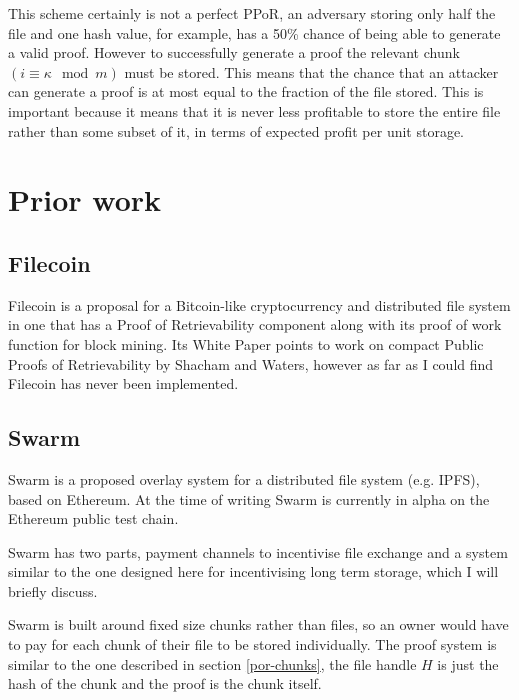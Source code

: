 \documentclass[12pt,a4paper,twoside,openright]{report}
\begin{document}

This scheme certainly is not a perfect PPoR, an adversary storing only half the file and one hash value, for example, has a 50\% chance of being able to generate a valid proof.
However to successfully generate a proof the relevant chunk $(i \equiv \kappa \mod m)$ must be stored.
This means that the chance that an attacker can generate a proof is at most equal to the fraction of the file stored.
This is important because it means that it is never less profitable to store the entire file rather than some subset of it, in terms of expected profit per unit storage.






\section{Prior work}


\subsection{Filecoin}

Filecoin is a proposal for a Bitcoin-like cryptocurrency and distributed file system in one
that has a Proof of Retrievability component along with its proof of work function for block mining.
Its White Paper\cite{filecoin} points to work on compact Public Proofs of Retrievability by Shacham and Waters\cite{compact-por},
however as far as I could find Filecoin has never been implemented.

\subsection{Swarm}


Swarm is a proposed overlay system for a distributed file system (e.g. IPFS\cite{ipfs}), based on Ethereum.
At the time of writing Swarm is currently in alpha on the Ethereum public test chain\cite{swarm-alpha}.

Swarm has two parts, payment channels to incentivise file exchange and a system similar to the one designed here for incentivising long term storage,
which I will briefly discuss.

Swarm is built around fixed size chunks rather than files, so an owner would have to pay for each chunk of their file to be stored individually.
The proof system is similar to the one described in section \ref{por-chunks}, the file handle ${H}$ is just the hash of the chunk and the proof is the chunk itself.
\end{document}
